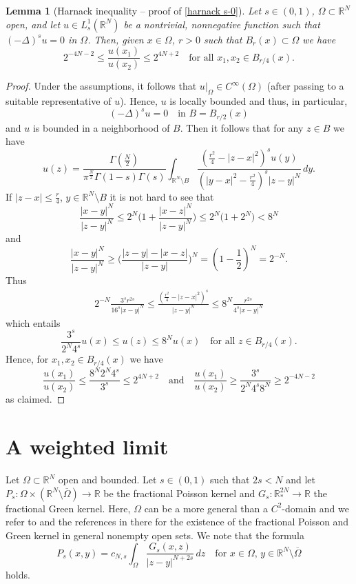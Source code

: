 \documentclass[notitlepage,11pt,reqno]{amsart}
\newtheorem{lemma}[theorem]{Lemma}
\theoremstyle{definition}
\numberwithin{equation}{section}
\newcommand{\R}{\mathds{R}}
\newcommand{\RR}{\mathds{R}}
\begin{document}
\begin{lemma}[Harnack inequality -- proof of \eqref{harnack s-0}]
Let $s\in(0,1)$, $\Omega\subset \RR^N$ open, and let $u\in L^1_s(\RR^N)$ be a nontrivial, nonnegative function such that $(-\Delta)^su=0$ in $\Omega$. Then, given $x\in\Omega$, $r>0$ such that $B_r(x)\subset \Omega$ we have
$$
2^{-4N-2}\leq \frac{u(x_1)}{u(x_2)}\leq 2^{4N+2}\quad\text{for all $x_1,x_2\in B_{r/4}(x)$.}
$$
\end{lemma}
\begin{proof}
Under the assumptions, it follows that $u|_{\Omega}\in C^{\infty}(\Omega)$ (after passing to a suitable representative of $u$). Hence, $u$ is locally bounded and thus, in particular,
$$
(-\Delta)^su=0 \quad \text{in $B=B_{r/2}(x)$}
$$
and $u$ is bounded in a neighborhood of $B$. Then it follows that for any $z\in B$ we have
$$
u(z)=\frac{\Gamma(\frac{N}{2})}{\pi^{\frac{N}{2}}\Gamma(1-s)\Gamma(s)}\int_{\RR^N\setminus B}\frac{(\frac{r^2}{4}-|z-x|^2)^su(y)}{(|y-x|^2-\frac{r^2}{4})^s|z-y|^N}\, dy.
$$
If $|z-x|\leq \frac{r}4$, $y\in \RR^N\setminus B$ it is not hard to see that
$$
\frac{|x-y|^N}{|z-y|^N}\leq 2^N\Big(1+\frac{|x-z|^N}{|z-y|^N}\Big)\leq 2^N\big(1+2^{N}\big)<8^N
$$
and
$$
\frac{|x-y|^N}{|z-y|^N}\geq \Big(\frac{|z-y|-|x-z|}{|z-y|}\Big)^N=(1-\frac12)^N=2^{-N}.
$$
Thus
\begin{align*}
2^{-N}\frac{3^sr^{2s}}{16^s|x-y|^N}\leq \frac{(\frac{r^2}{4}-|z-x|^2)^s}{|z-y|^N}\leq 8^N\frac{r^{2s}}{4^s|x-y|^N}
\end{align*}
which entails
$$
\frac{3^s}{2^N4^s}u(x)\leq u(z)\leq 8^Nu(x)\quad\text{for all $z\in B_{r/4}(x)$.}
$$
Hence, for $x_1,x_2\in B_{r/4}(x)$ we have
$$
\frac{u(x_1)}{u(x_2)}\leq \frac{8^N2^N4^s}{3^s}\leq 2^{4N+2}\quad\text{and}\quad \frac{u(x_1)}{u(x_2)}\geq \frac{3^s}{2^N4^s 8^N}\geq 2^{-4N-2}
$$
as claimed.
\end{proof}


\section{A weighted limit}\label{weighted limit}
Let $\Omega\subset \RR^N$ open and bounded. Let $s\in(0,1)$ such that $2s<N$ and let $P_s:\Omega\times (\RR^N\setminus\overline{\Omega})\to\RR$ be the fractional Poisson kernel and $G_s:\R^{2N}_{\ast}\to \RR$ the fractional Green kernel. Here, $\Omega$ can be a more general than a $C^2$-domain and we refer to \cite{BKK08} and the references in there for the existence of the fractional Poisson and Green kernel in general nonempty open sets. We note that the formula
\begin{equation}\label{ps-gs relation}
P_s(x,y)=c_{N,s}\int_{\Omega}\frac{G_s(x,z)}{|z-y|^{N+2s}}\, dz\quad\text{for $x\in\Omega$, $y\in \RR^N\setminus\overline{\Omega}$}
\end{equation}
holds.
\end{document}

